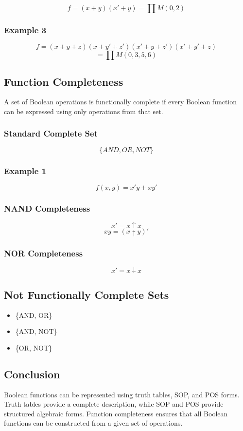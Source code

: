 \[
f = (x + y)(x' + y) = \prod M(0,2)
\]

\subsubsection*{Example 3}

\[
f = (x + y + z)(x + y' + z')(x' + y + z')(x' + y' + z)
\]
\[
= \prod M(0,3,5,6)
\]

\subsection{Function Completeness}

A set of Boolean operations is functionally complete if every Boolean function can be expressed using only operations from that set.

\subsubsection*{Standard Complete Set}
\[
\{AND, OR, NOT\}
\]

\subsubsection*{Example 1}

\[
f(x,y) = x'y + xy'
\]

\subsubsection*{NAND Completeness}

\[
x' = x \uparrow x
\]
\[
xy = (x \uparrow y)'
\]

\subsubsection*{NOR Completeness}

\[
x' = x \downarrow x
\]

\subsection{Not Functionally Complete Sets}
\begin{itemize}
    \item \{AND, OR\}
    \item \{AND, NOT\}
    \item \{OR, NOT\}
\end{itemize}

\subsection{Conclusion}

Boolean functions can be represented using truth tables, SOP, and POS forms. Truth tables provide a complete description, while SOP and POS provide structured algebraic forms. Function completeness ensures that all Boolean functions can be constructed from a given set of operations.

